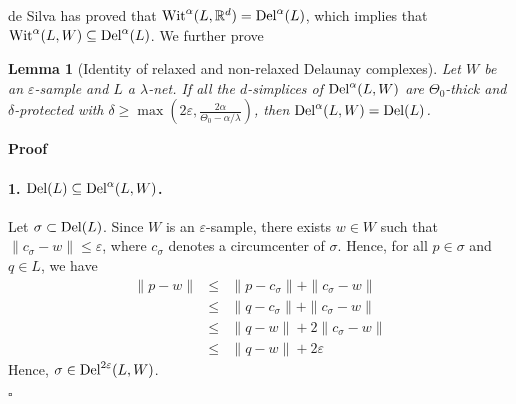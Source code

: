 \documentclass[11pt,a4paper]{article}
\newtheorem{lemma}{Lemma}
\newenvironment{proof}
        {\noindent \textbf{Proof} \hspace{0.3mm}}
        {\hspace{0.3mm}$\square$  \smallskip}
\newcommand{\e}{\varepsilon}
\newcommand{\R}{\mathbb R}
\newcommand{\del}{{\rm Del}}
\newcommand{\wit}{{\rm Wit}}
\begin{document}
de Silva has proved that $\wit^{\alpha}(L,\R^d)=
\del^{\alpha}(L)$, which implies that
$\wit^{\alpha}(L,W) \subseteq \del^{\alpha}(L)$.
We further prove



\begin{lemma}[Identity of relaxed and non-relaxed Delaunay complexes]
\label{lemma-identity3}
Let $W$ be an $\e$-sample and $L$ a $\lambda$-net. If all the $d$-simplices of $\del^{\alpha} (L,W)$
are $\Theta_0$-thick and $\delta$-protected with $\delta \geq
\max(2\e, \frac{2\alpha}{\Theta_0- \alpha/\lambda})$,
then $\del^{\alpha}(L,W)  = \del(L)$.
\end{lemma}

\begin{proof}
%
\paragraph{1. $\del (L)\subseteq \del^{\alpha}(L,W)$. }
Let $\sigma \subset \del (L)$. Since $W$ is an $\e$-sample, there
exists $w\in W$ such that $\| c_{\sigma}-w\|\leq \e$, where
$c_{\sigma}$ denotes a circumcenter of $\sigma$. Hence, for all
$p\in \sigma$ and $q\in L$, we have
\begin{eqnarray*}
 \| p-w\| & \leq & \| p-c_{\sigma}\| + \| c_{\sigma}-w\| \\
& \leq & \| q-c_{\sigma}\| + \| c_{\sigma}-w\| \\ 
& \leq & \| q-w\| + 2  \| c_{\sigma}-w\| \\
& \leq & \| q-w\| +2\e
\end{eqnarray*}
Hence, $\sigma\in \del^{2\e}(L,W)$.


\end{proof}
\end{document}
